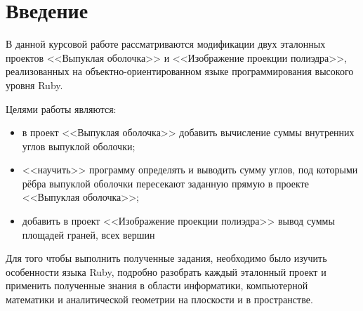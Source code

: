 \section{Введение}

В данной курсовой работе рассматриваются модификации двух эталонных проектов <<Выпуклая оболочка>> и <<Изображение проекции полиэдра>>, реализованных на объектно-ориентированном языке программирования высокого уровня Ruby.

Целями работы являются:
\begin{itemize}
\item в проект <<Выпуклая оболочка>> добавить вычисление суммы внутренних углов выпуклой оболочки;
\item <<научить>> программу определять и выводить сумму углов, под которыми рёбра выпуклой оболочки пересекают заданную прямую в проекте <<Выпуклая оболочка>>;
\item добавить в проект <<Изображение проекции полиэдра>> вывод суммы площадей граней, всех вершин
\end{itemize}

Для того чтобы выполнить полученные задания, необходимо было изучить особенности языка Ruby, подробно разобрать каждый эталонный проект и применить полученные знания в области информатики, компьютерной математики и аналитической геометрии на плоскости и в пространстве.

\endinput

